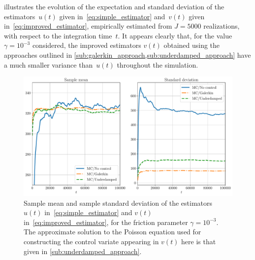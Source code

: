 \documentclass[11pt,a4paper]{article}
\begin{document}
 illustrates the evolution of the expectation and standard deviation of the estimators~$u(t)$ given in~\eqref{eq:simple_estimator} and~$v(t)$ given in~\eqref{eq:improved_estimator},
empirically estimated from $J = 5000$ realizations,
with respect to the integration time~$t$.
It appears clearly that,
for the value $\gamma = 10^{-3}$ considered,
the improved estimators $v(t)$ obtained using the approaches outlined in \cref{sub:galerkin_approach,sub:underdamped_approach}
have a much smaller variance than~$u(t)$ throughout the simulation.
\begin{figure}[ht]
    \centering
    \includegraphics[width=0.99\linewidth]{figures/time.pdf}
    \caption{
        Sample mean and sample standard deviation of the estimators $u(t)$ in~\eqref{eq:simple_estimator} and $v(t)$ in~\eqref{eq:improved_estimator},
        for the friction parameter $\gamma = 10^{-3}$.
        The approximate solution to the Poisson equation used for constructing the control variate appearing in $v(t)$ here
        is that given in \cref{sub:underdamped_approach}.
    }%
    \label{fig:time_bias_variance}
\end{figure}
\end{document}
